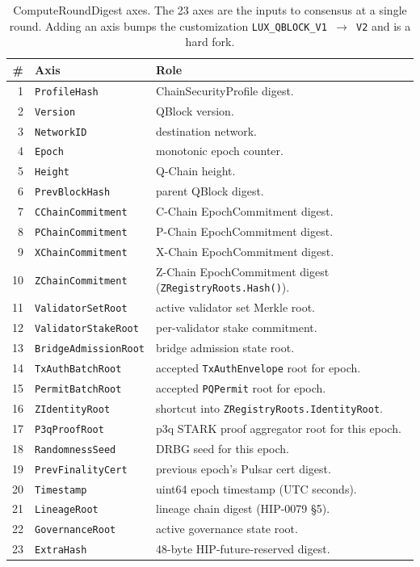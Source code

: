 \begin{table}[H]
\centering
\caption{ComputeRoundDigest axes. The 23 axes are the inputs to consensus
at a single round. Adding an axis bumps the customization
\texttt{LUX\_QBLOCK\_V1 $\to$ V2} and is a hard fork.}
\label{tab:qblock-axes}
\begin{tabular}{rlp{8cm}}
\toprule
\# & Axis & Role \\
\midrule
1  & \texttt{ProfileHash}             & ChainSecurityProfile digest. \\
2  & \texttt{Version}                 & QBlock version. \\
3  & \texttt{NetworkID}               & destination network. \\
4  & \texttt{Epoch}                   & monotonic epoch counter. \\
5  & \texttt{Height}                  & Q-Chain height. \\
6  & \texttt{PrevBlockHash}           & parent QBlock digest. \\
7  & \texttt{CChainCommitment}        & C-Chain EpochCommitment digest. \\
8  & \texttt{PChainCommitment}        & P-Chain EpochCommitment digest. \\
9  & \texttt{XChainCommitment}        & X-Chain EpochCommitment digest. \\
10 & \texttt{ZChainCommitment}        & Z-Chain EpochCommitment digest (\texttt{ZRegistryRoots.Hash()}). \\
11 & \texttt{ValidatorSetRoot}        & active validator set Merkle root. \\
12 & \texttt{ValidatorStakeRoot}      & per-validator stake commitment. \\
13 & \texttt{BridgeAdmissionRoot}     & bridge admission state root. \\
14 & \texttt{TxAuthBatchRoot}         & accepted \texttt{TxAuthEnvelope} root for epoch. \\
15 & \texttt{PermitBatchRoot}         & accepted \texttt{PQPermit} root for epoch. \\
16 & \texttt{ZIdentityRoot}           & shortcut into \texttt{ZRegistryRoots.IdentityRoot}. \\
17 & \texttt{P3qProofRoot}            & p3q STARK proof aggregator root for this epoch. \\
18 & \texttt{RandomnessSeed}          & DRBG seed for this epoch. \\
19 & \texttt{PrevFinalityCert}        & previous epoch's Pulsar cert digest. \\
20 & \texttt{Timestamp}               & uint64 epoch timestamp (UTC seconds). \\
21 & \texttt{LineageRoot}             & lineage chain digest (HIP-0079 §5). \\
22 & \texttt{GovernanceRoot}          & active governance state root. \\
23 & \texttt{ExtraHash}               & 48-byte HIP-future-reserved digest. \\
\bottomrule
\end{tabular}
\end{table}

